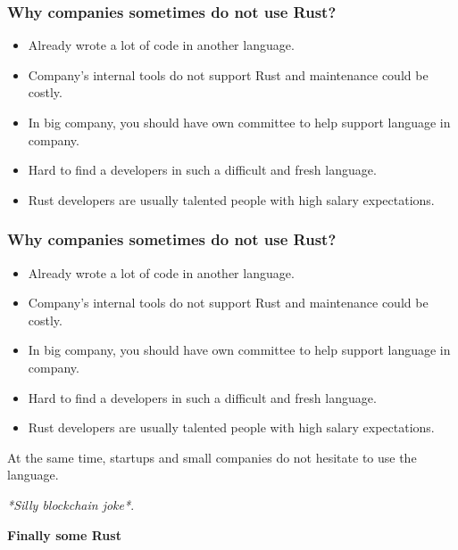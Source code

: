 \documentclass[aspectratio=1610,t]{beamer}
\begin{document}

\begin{frame}
\frametitle{Why companies sometimes do \textbf{not} use Rust?}

\begin{itemize}
    \item Already wrote a lot of code in another language.
    \item Company's internal tools do not support Rust and maintenance could be costly.
    \item In big company, you should have own committee to help support language in company. 
    \item Hard to find a developers in such a difficult and fresh language.
    \item Rust developers are usually talented people with high salary expectations.
\end{itemize}
\end{frame}


\begin{frame}
\frametitle{Why companies sometimes do \textbf{not} use Rust?}

\begin{itemize}
    \item Already wrote a lot of code in another language.
    \item Company's internal tools do not support Rust and maintenance could be costly.
    \item In big company, you should have own committee to help support language in company. 
    \item Hard to find a developers in such a difficult and fresh language.
    \item Rust developers are usually talented people with high salary expectations.
\end{itemize}

At the same time, startups and small companies do not hesitate to use the language.

\textit{*Silly blockchain joke*}.
\end{frame}


\begin{frame}[c]
\centering\Huge\textbf{Finally some Rust}
\end{frame}
\end{document}
